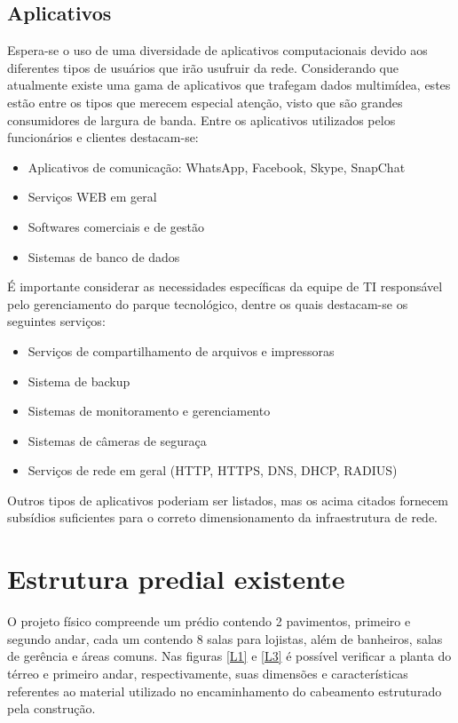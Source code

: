 \documentclass[	DIV=calc,%
							paper=a4,%
							fontsize=12pt,%
							onecolumn]{scrartcl}	 					%
\begin{document}
\subsection{Aplicativos}
Espera-se o uso de uma diversidade de aplicativos computacionais devido aos diferentes tipos de usuários que irão usufruir da rede. Considerando que atualmente existe uma gama de aplicativos que trafegam dados multimídea, 
estes estão entre os tipos que merecem especial atenção, visto que são grandes consumidores de largura de banda.
Entre os aplicativos utilizados pelos funcionários e clientes destacam-se:
\begin{itemize}
	\item Aplicativos de comunicação: WhatsApp, Facebook, Skype, SnapChat
	\item Serviços WEB em geral
	\item Softwares comerciais e de gestão
	\item Sistemas de banco de dados
\end{itemize}
É importante considerar as necessidades específicas da equipe de TI responsável pelo gerenciamento do parque tecnológico, dentre os quais destacam-se os seguintes serviços:
\begin{itemize}
	\item Serviços de compartilhamento de arquivos e impressoras
	\item Sistema de backup 
	\item Sistemas de monitoramento e gerenciamento
	\item Sistemas de câmeras de seguraça
	\item Serviços de rede em geral (HTTP, HTTPS, DNS, DHCP, RADIUS)
\end{itemize} 
Outros tipos de aplicativos poderiam ser listados, mas os acima citados fornecem subsídios suficientes para o correto dimensionamento da infraestrutura de rede.

\section{Estrutura predial existente}
O projeto físico compreende um prédio contendo 2 pavimentos, primeiro e segundo andar, cada um contendo 8 salas para lojistas, além de banheiros, salas de gerência e áreas comuns.
Nas figuras \ref{L1} e \ref{L3} é possível verificar a planta do térreo e primeiro andar, respectivamente, suas dimensões e características referentes ao material utilizado no encaminhamento do cabeamento estruturado pela construção.
\end{document}
